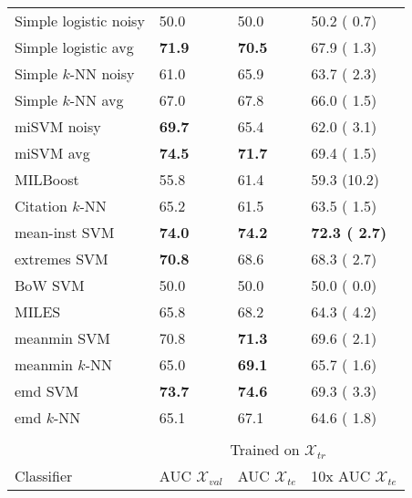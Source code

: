 \documentclass[10pt,conference,a4paper]{IEEEtran}
\begin{document}
\begin{table}[ht]
\begin{center}
\begin{tabular}{l l l l}
\hline


Simple logistic noisy & 50.0 & 50.0 & 50.2 ( 0.7)\\
Simple logistic avg   & {\bf 71.9 }& {\bf 70.5 }& 67.9 ( 1.3)\\
Simple $k$-NN noisy     & 61.0 & 65.9 & 63.7 ( 2.3)\\
Simple $k$-NN avg       & 67.0 & 67.8 & 66.0 ( 1.5)\\
miSVM noisy           & {\bf 69.7 }& 65.4 & 62.0 ( 3.1)\\
miSVM avg             & {\bf 74.5 }& {\bf 71.7 }& 69.4 ( 1.5)\\
MILBoost 		           & 55.8 & 61.4 & 59.3 (10.2)\\
Citation $k$-NN         & 65.2 & 61.5 & 63.5 ( 1.5)\\
mean-inst SVM         & {\bf 74.0 }& {\bf 74.2 }& {\bf 72.3 ( 2.7)}\\
extremes SVM          & {\bf 70.8 }& 68.6 & 68.3 ( 2.7)\\
BoW SVM               & 50.0 & 50.0 & 50.0 ( 0.0)\\
MILES                 & 65.8 & 68.2 & 64.3 ( 4.2)\\
meanmin SVM           & 70.8 & {\bf 71.3 }& 69.6 ( 2.1)\\
meanmin $k$-NN          & 65.0 & {\bf 69.1 }& 65.7 ( 1.6)\\
emd SVM               & {\bf 73.7 }& {\bf 74.6 }& 69.3 ( 3.3)\\
emd $k$-NN              & 65.1 & 67.1 & 64.6 ( 1.8)\\



& & & \\



 & \multicolumn{3}{c}{Trained on $\mathcal{X}_{tr}$} \\


                    Classifier &    AUC $\mathcal{X}_{val}$ & AUC $\mathcal{X}_{te}$ & 10x AUC $\mathcal{X}_{te}$ \\
 \hline


\end{tabular}
\end{center}
\end{table}
\end{document}
